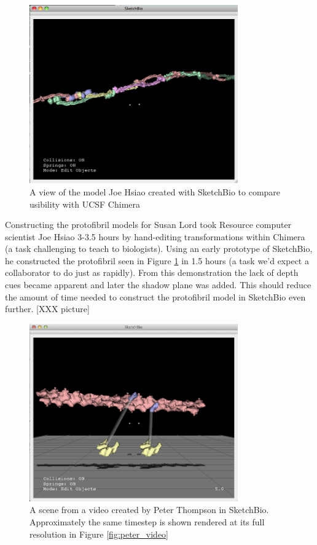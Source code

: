 \documentclass{article} %
\begin{document}
\begin{figure}[h]
\centering
\includegraphics[width=0.8\textwidth]{joe_test.png}
\caption{A view of the model Joe Hsiao created with SketchBio to compare usibility with UCSF Chimera}
\label{fig:joe_test}
\end{figure}

Constructing the protofibril models for Susan Lord took Resource computer scientist Joe Hsiao 3-3.5 hours by hand-editing transformations within Chimera (a task challenging to teach to biologists).  Using an early prototype of SketchBio, he constructed the protofibril seen in Figure \ref{fig:joe_test} in 1.5 hours (a task we’d expect a collaborator to do just as rapidly).  From this demonstration the lack of depth cues became apparent and later the shadow plane was added.  This should reduce the amount of time needed to construct the protofibril model in SketchBio even further. [XXX picture]

\begin{figure}[h]
\centering
\includegraphics[width=0.8\textwidth]{peter_model.png}
\caption{A scene from a video created by Peter Thompson in SketchBio.  Approximately the same timestep is shown rendered at its full resolution in Figure \ref{fig:peter_video}}
\label{fig:peter_model}
\end{figure}
\end{document}
